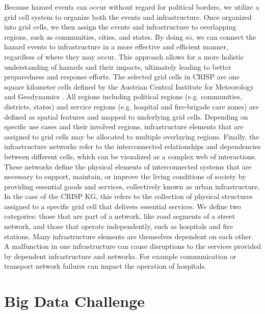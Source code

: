 \documentclass[
]{ceurart}
\begin{document}
Because hazard events can occur without regard for political borders, we utilize a grid cell system to organize both the events and infrastructure. Once organized into grid cells, we then assign the events and infrastructure to overlapping regions, such as communities, cities, and states. By doing so, we can connect the hazard events to infrastructure in a more effective and efficient manner, regardless of where they may occur. This approach allows for a more holistic understanding of hazards and their impacts, ultimately leading to better preparedness and response efforts. The selected grid cells in CRISP are one square kilometer cells defined by the Austrian Central Institute for Meteorology and Geodynamics \cite{haiden2011integrated}. All regions including political regions (e.g. communities, districts, states) and service regions (e.g. hospital and fire-brigade care zones) are defined as spatial features and mapped to underlying grid cells. Depending on specific use cases and their involved regions, infrastructure elements that are assigned to grid cells may be allocated to multiple overlaying regions. 
Finally, the infrastructure networks refer to the interconnected relationships and dependencies between different cells, which can be visualized as a complex web of interactions. These networks define the physical elements of interconnected systems that are necessary to support, maintain, or improve the living conditions of society by providing essential goods and services, collectively known as urban infrastructure. In the case of the CRISP KG, this refers to the collection of physical structures assigned to a specific grid cell that delivers essential services. We define two categories: those that are part of a network, like road segments of a street network, and those that operate independently, such as hospitals and fire stations. Many infrastructure elements are themselves dependent on each other. A malfunction in one infrastructure can cause disruptions to the services provided by dependent infrastructure and networks. For example communication or transport network failures can impact the operation of hospitals.





\section{Big Data Challenge}
\end{document}
